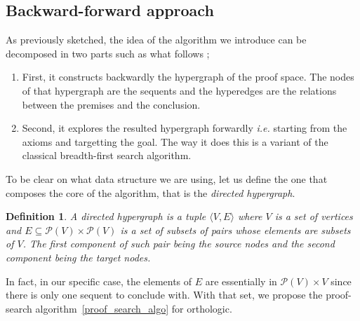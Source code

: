 \documentclass[a4paper, 11pt]{article}
\newtheorem{definition}[theorem]{Definition}
\newcommand{\ie}{ \textit{i.e.} }
\begin{document}
    \subsection{Backward-forward approach}
    As previously sketched, the idea of the algorithm we introduce can be decomposed in two parts such as
    what follows ;
    \begin{enumerate}
	\item
		First, it constructs backwardly the hypergraph of the proof space. The nodes of 
		    that hypergraph 
	are the sequents and the hyperedges are the relations between the premises and the conclusion. 
	\item
	Second, it explores the resulted hypergraph forwardly \ie starting from the axioms and targetting
	the goal. 
	The way it does this is a variant of the classical breadth-first search algorithm.
    \end{enumerate}
    To be clear on what data structure we are using, let us define the one that composes the core of the
    algorithm, that is the \textit{directed hypergraph}.
    \begin{definition}
	    A directed hypergraph is a tuple $\langle V,E\rangle$ where $V$ is a set of 
	    vertices and $E\subseteq\mathcal{P}(V)\times\mathcal{P}(V)$ is a set of 
	    subsets of pairs whose elements are subsets of $V$. The
	    first component of such pair being the source nodes and the second component being the
	    target nodes.
    \end{definition}
    In fact, in our specific case, the elements of $E$ are essentially in $\mathcal{P}(V)\times V$ since
    there is only one sequent to conclude with. With that set, we propose the proof-search 
    algorithm~\ref{proof_search_algo} for orthologic.
\end{document}
